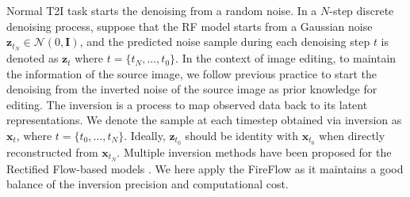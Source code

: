 \documentclass{article}
\begin{document}
Normal T2I task starts the denoising from a random noise. In a $N$-step discrete denoising process, suppose that the RF model starts from a Gaussian noise 
$\mathbf{z}_{t_{N}}\in\mathcal{N}(0,\boldsymbol{I})$, and the predicted noise sample during each denoising step $t$ is denoted as $\mathbf{z}_{t}$ where $t=\{t_{N},...,t_{0}\}$. In the context of image editing, to maintain the information of the source image, we follow previous practice to start the denoising from the inverted noise of the source image as prior knowledge for editing. The inversion is a process to map observed data
back to its latent representations. We denote the sample at each timestep obtained via inversion as $\mathbf{x}_{t}$, where $t=\{t_{0},...,t_{N}\}$. Ideally, $\mathbf{z}_{t_0}$ should be identity with $\mathbf{x}_{t_0}$ when directly reconstructed from $\mathbf{x}_{t_N}$. Multiple inversion methods have been proposed for the Rectified Flow-based models \citep{rout2024semantic, wang2024taming, deng2024fireflow}. We here apply the FireFlow \citep{deng2024fireflow}  as it maintains a good balance of the inversion precision and computational cost. 

\end{document}
